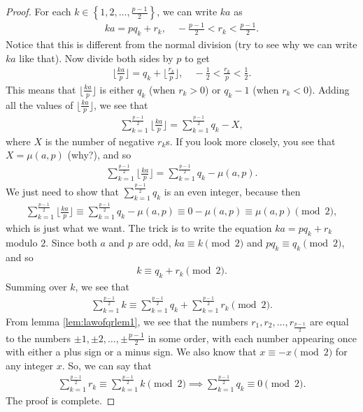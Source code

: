 \documentclass{subfile}
\begin{document}
\begin{proof}
	For each $k \in \left\{1, 2, \dots, \frac{p-1}{2} \right\}$, we can write $ka$ as
	\begin{align*}
	ka = pq_k + r_k, \quad -\frac{p-1}{2}<r_k< \frac{p-1}{2}.
	\end{align*}
	Notice that this is different from the normal division (try to see why we can write $ka$ like that). Now divide both sides by $p$ to get
	\begin{align*}
	\Big\lfloor\frac{ka}{p} \Big\rfloor = q_k + \Big\lfloor\frac{r_k}{p}\Big\rfloor, \quad -\frac{1}{2}<\frac{r_k}{p}< \frac{1}{2}.
	\end{align*}
	This means that $\Big\lfloor\frac{ka}{p} \Big\rfloor$ is either $q_k$ (when $r_k >0$) or $q_k -1$ (when $r_k<0$). Adding all the values of $\Big\lfloor\frac{ka}{p} \Big\rfloor$, we see that
	\begin{align*}
	\displaystyle \sum_{k=1}^{\frac{p-1}{2}} \Big\lfloor\frac{ka}{p} \Big\rfloor = \sum_{k=1}^{\frac{p-1}{2}} q_k - X,
	\end{align*}
	where $X$ is the number of negative $r_k$s. If you look more closely, you see that $X= \mu(a,p)$ (why?), and so
	\begin{align*}
	\displaystyle \sum_{k=1}^{\frac{p-1}{2}} \Big\lfloor\frac{ka}{p} \Big\rfloor = \sum_{k=1}^{\frac{p-1}{2}} q_k - \mu(a,p).
	\end{align*}
	We just need to show that $\displaystyle\sum_{k=1}^{\frac{p-1}{2}} q_k$ is an even integer, because then 
	\begin{align*}
	\sum_{k=1}^{\frac{p-1}{2}} \Big\lfloor\frac{ka}{p} \Big\rfloor \equiv \sum_{k=1}^{\frac{p-1}{2}} q_k - \mu(a,p) \equiv 0 -  \mu(a,p) \equiv  \mu(a,p) \pmod 2,
	\end{align*}
	which is just what we want. The trick is to write the equation $ka = pq_k + r_k$ modulo $2$. Since both $a$ and $p$ are odd, $ka \equiv k \pmod 2$ and $pq_k \equiv q_k \pmod 2$, and so
	\begin{align*}
	k \equiv q_k + r_k \pmod 2.
	\end{align*}
	Summing over $k$, we see that
	\begin{align*}
	\sum_{k=1}^{\frac{p-1}{2}}k \equiv \sum_{k=1}^{\frac{p-1}{2}} q_k + \sum_{k=1}^{\frac{p-1}{2}} r_k \pmod 2.
	\end{align*}
	From lemma \eqref{lem:lawofqrlem1}, we see that the numbers $r_1, r_2, \ldots, r_{\frac{p-1}{2}}$ are equal to the numbers $\pm 1, \pm 2, \ldots, \pm \frac{p-1}{2}$ in some order, with each number appearing once with either a plus sign or a minus sign. We also know that $x \equiv -x \pmod 2$ for any integer $x$. So, we can say that
	\begin{align*}
	\sum_{k=1}^{\frac{p-1}{2}} r_k \equiv \sum_{k=1}^{\frac{p-1}{2}}k \pmod 2 \implies \sum_{k=1}^{\frac{p-1}{2}} q_k \equiv 0 \pmod 2.
	\end{align*}
	The proof is complete.
\end{proof}
\end{document}
